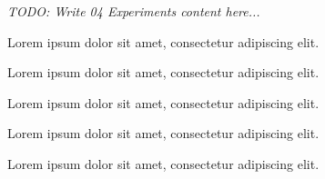 \textit{TODO: Write 04 Experiments content here...}
\par Lorem ipsum dolor sit amet, consectetur adipiscing elit. \par Lorem ipsum dolor sit amet, consectetur adipiscing elit. \par Lorem ipsum dolor sit amet, consectetur adipiscing elit. \par Lorem ipsum dolor sit amet, consectetur adipiscing elit. \par Lorem ipsum dolor sit amet, consectetur adipiscing elit. 
